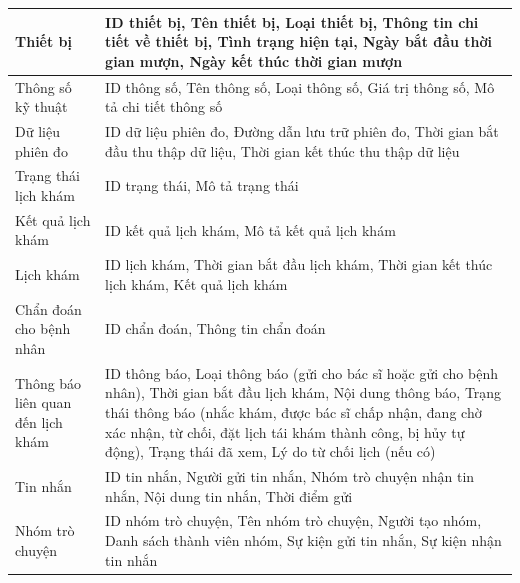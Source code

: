 \begin{table}[H]
\begin{tabularx}{\textwidth}{|p{4.5cm}|X|}
		\hline
		Thiết bị                          &
		ID thiết bị, Tên thiết bị, Loại thiết bị, Thông tin chi tiết về thiết bị, Tình trạng hiện tại, Ngày bắt đầu thời gian mượn, Ngày kết thúc thời gian mượn    \\
		\hline
		Thông số kỹ thuật                 &
		ID thông số, Tên thông số, Loại thông số, Giá trị thông số, Mô tả chi tiết thông số                                                                         \\
		\hline
		Dữ liệu phiên đo                  &
		ID dữ liệu phiên đo, Đường dẫn lưu trữ phiên đo, Thời gian bắt đầu thu thập dữ liệu, Thời gian kết thúc thu thập dữ liệu                                    \\
		\hline
		Trạng thái lịch khám              &
		ID trạng thái, Mô tả trạng thái                                                                                                                             \\
		\hline
		Kết quả lịch khám                 &
		ID kết quả lịch khám, Mô tả kết quả lịch khám                                                                                                               \\
		\hline
		Lịch khám                         &
		ID lịch khám, Thời gian bắt đầu lịch khám, Thời gian kết thúc lịch khám, Kết quả lịch khám                                                                  \\
		\hline
		Chẩn đoán cho bệnh nhân           &
		ID chẩn đoán, Thông tin chẩn đoán                                                                                                                           \\
		\hline
		Thông báo liên quan đến lịch khám &
		ID thông báo, Loại thông báo (gửi cho bác sĩ hoặc gửi cho bệnh nhân), Thời gian bắt đầu lịch khám, Nội dung thông báo,
		Trạng thái thông báo (nhắc khám, được bác sĩ chấp nhận, đang chờ xác nhận, từ chối, đặt lịch tái khám thành công, bị hủy tự động),
		Trạng thái đã xem, Lý do từ chối lịch (nếu có)                                                                                                              \\
		\hline
		Tin nhắn                          &
		ID tin nhắn, Người gửi tin nhắn, Nhóm trò chuyện nhận tin nhắn, Nội dung tin nhắn, Thời điểm gửi                                                            \\
		\hline
		Nhóm trò chuyện                   &
		ID nhóm trò chuyện, Tên nhóm trò chuyện, Người tạo nhóm, Danh sách thành viên nhóm, Sự kiện gửi tin nhắn, Sự kiện nhận tin nhắn                             \\
		\hline
	\end{tabularx}
\end{table}

